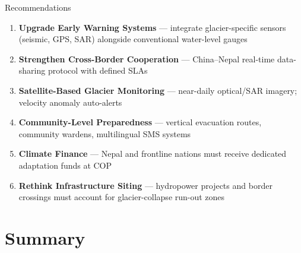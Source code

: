 \documentclass[aspectratio=169, 12pt]{beamer}
\begin{document}
	\begin{frame}{Recommendations}
		\begin{enumerate}
			\item \textbf{Upgrade Early Warning Systems} --- integrate
			glacier-specific sensors (seismic, GPS, SAR) alongside
			conventional water-level gauges
			\item \textbf{Strengthen Cross-Border Cooperation} --- China--Nepal
			real-time data-sharing protocol with defined SLAs
			\item \textbf{Satellite-Based Glacier Monitoring} --- near-daily
			optical/SAR imagery; velocity anomaly auto-alerts
			\item \textbf{Community-Level Preparedness} --- vertical evacuation
			routes, community wardens, multilingual SMS systems
			\item \textbf{Climate Finance} --- Nepal and frontline nations must
			receive dedicated adaptation funds at COP
			\item \textbf{Rethink Infrastructure Siting} --- hydropower projects
			and border crossings must account for glacier-collapse
			run-out zones
		\end{enumerate}
	\end{frame}
	
	\section*{Summary}
	
\end{document}
